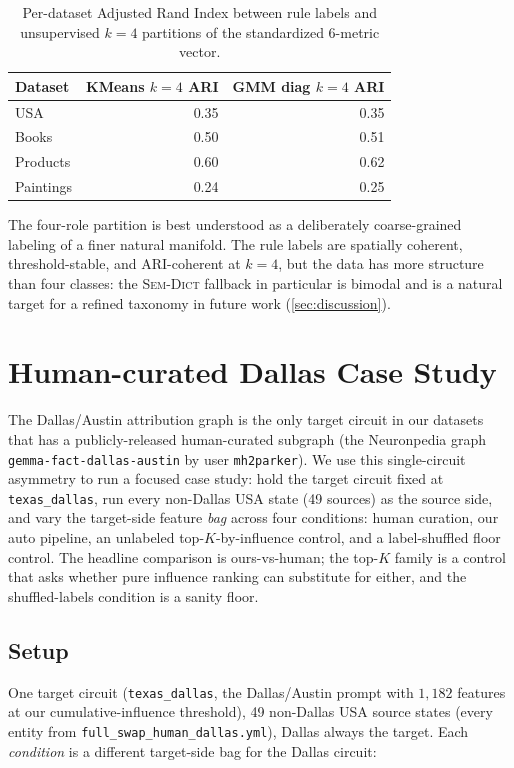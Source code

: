 \begin{table}[h]
\centering\small
\begin{tabular}{lrr}
\toprule
Dataset & KMeans $k{=}4$ ARI & GMM diag $k{=}4$ ARI \\
\midrule
USA       & 0.35 & 0.35 \\
Books     & 0.50 & 0.51 \\
Products  & 0.60 & 0.62 \\
Paintings & 0.24 & 0.25 \\
\bottomrule
\end{tabular}
\caption{Per-dataset Adjusted Rand Index between rule labels and unsupervised $k{=}4$ partitions of the standardized 6-metric vector.}
\label{tab:cluster-ari}
\end{table}

The four-role partition is best understood as a deliberately coarse-grained labeling of a finer natural manifold. The rule labels are spatially coherent, threshold-stable, and ARI-coherent at $k{=}4$, but the data has more structure than four classes: the \textsc{Sem-Dict} fallback in particular is bimodal and is a natural target for a refined taxonomy in future work (\cref{sec:discussion}).

\section{Human-curated Dallas Case Study}
\label{appx:dallas_case}

The Dallas/Austin attribution graph is the only target circuit in our datasets that has a publicly-released human-curated subgraph (the Neuronpedia graph \texttt{gemma-fact-dallas-austin} by user \texttt{mh2parker}). We use this single-circuit asymmetry to run a focused case study: hold the target circuit fixed at \texttt{texas\_dallas}, run every non-Dallas USA state (49 sources) as the source side, and vary the target-side feature \emph{bag} across four conditions: human curation, our auto pipeline, an unlabeled top-$K$-by-influence control, and a label-shuffled floor control. The headline comparison is ours-vs-human; the top-$K$ family is a control that asks whether pure influence ranking can substitute for either, and the shuffled-labels condition is a sanity floor.

\subsection{Setup}
One target circuit (\texttt{texas\_dallas}, the Dallas/Austin prompt with $1{,}182$ features at our cumulative-influence threshold), 49 non-Dallas USA source states (every entity from \texttt{full\_swap\_human\_dallas.yml}), Dallas always the target. Each \emph{condition} is a different target-side bag for the Dallas circuit:

